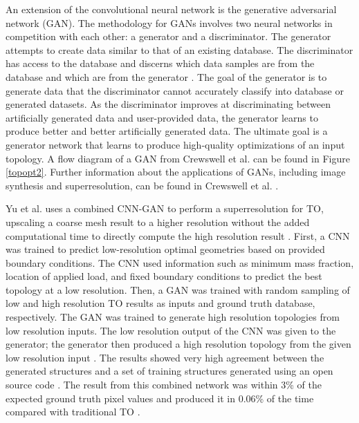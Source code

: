 An extension of the convolutional neural network is the generative adversarial network (GAN). The methodology for GANs involves two neural networks in competition with each other: a generator and a discriminator. The generator attempts to create data similar to that of an existing database. The discriminator has access to the database and discerns which data samples are from the database and which are from the generator \cite{Creswell2018}. The goal of the generator is to generate data that the discriminator cannot accurately classify into database or generated datasets. As the discriminator improves at discriminating between artificially generated data and user-provided data, the generator learns to produce better and better artificially generated data. The ultimate goal is a generator network that learns to produce high-quality optimizations of an input topology. A flow diagram of a GAN from Crewswell et al. can be found in Figure \ref{topopt2}. Further information about the applications of GANs, including image synthesis and superresolution, can be found in Crewswell et al. \cite{Creswell2018}.


Yu et al. uses a combined CNN-GAN to perform a superresolution for TO, upscaling a coarse mesh result to a higher resolution without the added computational time to directly compute the high resolution result \cite{Yu2019}. First, a CNN was trained to predict low-resolution optimal geometries based on provided boundary conditions. The CNN used information such as minimum mass fraction, location of applied load, and fixed boundary conditions to predict the best topology at a low resolution. Then, a GAN was trained with random sampling of low and high resolution TO results as inputs and ground truth database, respectively. The GAN was trained to generate high resolution topologies from low resolution inputs. The low resolution output of the CNN was given to the generator; the generator then produced a high resolution topology from the given low resolution input \cite{Yu2019}. The results showed very high agreement between the generated structures and a set of training structures generated using an open source code \cite{Andreassen2011}. The result from this combined network was within 3\% of the expected ground truth pixel values and produced it in 0.06\% of the time compared with traditional TO \cite{Yu2019}.

